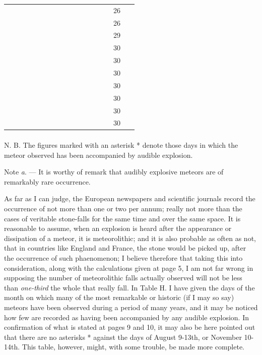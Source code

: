 \documentclass[a4paper, 12pt, oneside]{article}
\begin{document}
\begin{table}[H]
\begin{tabular}{|l|l|l|l|l|l|l|l|l|l|l|l|}
        ~ & ~ & ~ & ~ & ~ & ~ & ~ & ~ & ~ & ~ & 26 & ~ \\
        ~ & ~ & ~ & ~ & ~ & ~ & ~ & ~ & ~ & ~ & 26 & ~ \\
        ~ & ~ & ~ & ~ & ~ & ~ & ~ & ~ & ~ & ~ & 29 & ~ \\
        ~ & ~ & ~ & ~ & ~ & ~ & ~ & ~ & ~ & ~ & 30 & ~ \\
        ~ & ~ & ~ & ~ & ~ & ~ & ~ & ~ & ~ & ~ & 30 & ~ \\
        ~ & ~ & ~ & ~ & ~ & ~ & ~ & ~ & ~ & ~ & 30 & ~ \\
        ~ & ~ & ~ & ~ & ~ & ~ & ~ & ~ & ~ & ~ & 30 & ~ \\
        ~ & ~ & ~ & ~ & ~ & ~ & ~ & ~ & ~ & ~ & 30 & ~ \\
        ~ & ~ & ~ & ~ & ~ & ~ & ~ & ~ & ~ & ~ & 30 & ~ \\
        ~ & ~ & ~ & ~ & ~ & ~ & ~ & ~ & ~ & ~ & 30 & ~ \\ \hline
    \end{tabular}
\end{table}
\paragraph{}
N. B. The figures marked with an asterisk * denote those days in which the meteor observed has been accompanied by audible explosion.

Note \emph{a}. --- It is worthy of remark that audibly explosive meteors are of remarkably rare occurrence.

As far as I can judge, the European newspapers and scientific journals record the occurrence of not more than one or two per annum; really not more than the cases of veritable stone-falls for the same time and over the same space. It is reasonable to assume, when an explosion is heard after the appearance or dissipation of a meteor, it is meteorolithic; and it is also probable as often as not, that in countries like England and France, the stone would be picked up, after the occurrence of such phaenomenon; I believe therefore that taking this into consideration, along with the calculations given at page 5, I am not far wrong in supposing the number of meteorolithic falls actually observed will not be less than \emph{one-third} the whole that really fall. In Table H. I have given the days of the month on which many of the most remarkable or historic (if I may so say) meteors have been observed during a period of many years, and it may be noticed how few are recorded as having been accompanied by any audible explosion. In confirmation of what is stated at pages 9 and 10, it may also be here pointed out that there are no asterisks * against the days of August 9-13th, or November 10-14th. This table, however, might, with some trouble, be made more complete.
\clearpage
\end{document}
